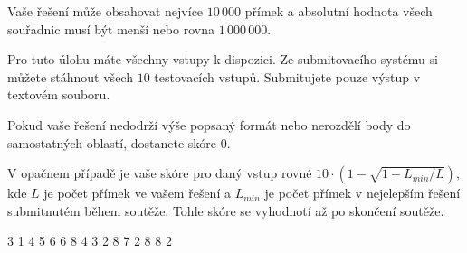 Vaše řešení může obsahovat nejvíce $10\,000$ přímek a absolutní hodnota všech souřadnic musí být menší nebo rovna $1\,000\,000$.


Pro tuto úlohu máte všechny vstupy k dispozici. Ze submitovacího systému si můžete stáhnout všech $10$ testovacích vstupů. Submitujete pouze výstup v textovém souboru.

Pokud vaše řešení nedodrží výše popsaný formát nebo nerozdělí body do samostatných oblastí, dostanete skóre $0$.

V opačnem případě je vaše skóre pro daný vstup rovné
$ 10 \cdot \left(1 - \sqrt{1 - L_{min} / L}\right)$,
kde $L$ je počet přímek ve vašem řešení a $L_{min}$ je počet přímek v nejelepším řešení submitnutém během soutěže.
Tohle skóre se vyhodnotí až po skončení soutěže.


3 1
4 5
6 6
8 4
3 2 8 7
2 8 8 2
\sampleEND


